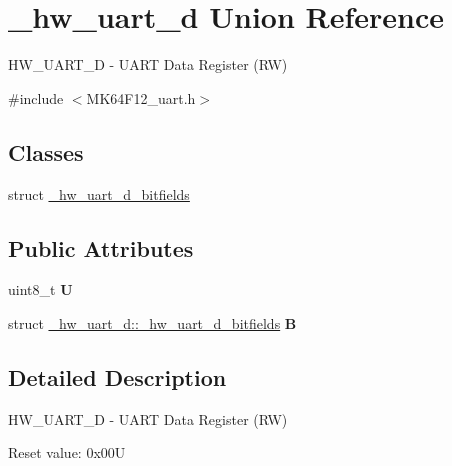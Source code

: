 \hypertarget{union__hw__uart__d}{}\section{\+\_\+hw\+\_\+uart\+\_\+d Union Reference}
\label{union__hw__uart__d}


H\+W\+\_\+\+U\+A\+R\+T\+\_\+D -\/ U\+A\+RT Data Register (RW)  




{\ttfamily \#include $<$M\+K64\+F12\+\_\+uart.\+h$>$}

\subsection*{Classes}
\begin{DoxyCompactItemize}
\item 
struct \hyperlink{struct__hw__uart__d_1_1__hw__uart__d__bitfields}{\+\_\+hw\+\_\+uart\+\_\+d\+\_\+bitfields}
\end{DoxyCompactItemize}
\subsection*{Public Attributes}
\begin{DoxyCompactItemize}
\item 
uint8\+\_\+t {\bfseries U}\hypertarget{union__hw__uart__d_a1fad3b9f111d5c7579ef11caf3677f03}{}\label{union__hw__uart__d_a1fad3b9f111d5c7579ef11caf3677f03}

\item 
struct \hyperlink{struct__hw__uart__d_1_1__hw__uart__d__bitfields}{\+\_\+hw\+\_\+uart\+\_\+d\+::\+\_\+hw\+\_\+uart\+\_\+d\+\_\+bitfields} {\bfseries B}\hypertarget{union__hw__uart__d_a15d593cf6a22d6872ec5da3285165eea}{}\label{union__hw__uart__d_a15d593cf6a22d6872ec5da3285165eea}

\end{DoxyCompactItemize}


\subsection{Detailed Description}
H\+W\+\_\+\+U\+A\+R\+T\+\_\+D -\/ U\+A\+RT Data Register (RW) 

Reset value\+: 0x00U

